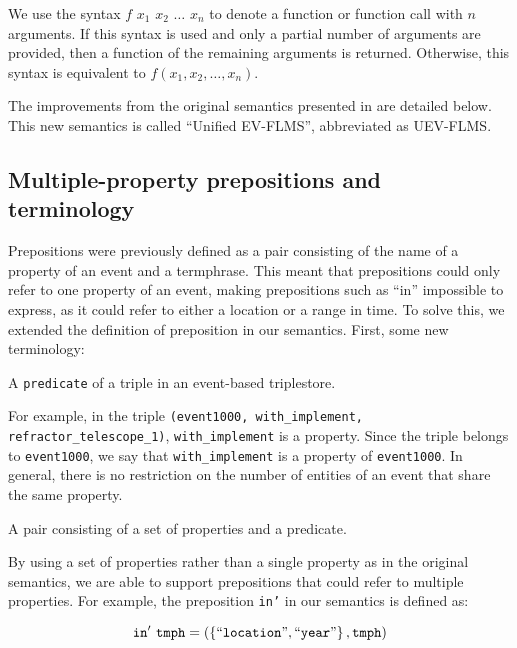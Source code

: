 \documentclass[../main.tex]{subfiles}
\begin{document}
We use the syntax $f$ $x_1$ $x_2$ $\dots$ $x_n$ to denote a function or function call with $n$ arguments.  If this syntax is used
and only a partial number of arguments are provided, then a function of the remaining arguments is returned.  Otherwise,
this syntax is equivalent to $f(x_1, x_2, \dots, x_n)$.

The improvements from the original semantics presented in
\cite{frost2014demonstration}\cite{frostagboola2014} are detailed below.
This new semantics is called ``Unified EV-FLMS'', abbreviated as UEV-FLMS.

\subsection{Multiple-property prepositions and terminology}

Prepositions were previously defined as a pair consisting of the name of a property of an event and a termphrase.  This meant that prepositions could
only refer to one property of an event, making prepositions such as ``in''
impossible to express, as it could refer to either a location or a range in time.
To solve this, we extended the definition of preposition in our semantics.  First, some new terminology:

\begin{definition}[Property]
	A \texttt{predicate} of a triple in an event-based triplestore.
\end{definition}

For example, in the triple \texttt{(event1000, with\_implement, refractor\_telescope\_1)}, \texttt{with\_implement} is a property.  Since the triple belongs to \texttt{event1000}, we say that \texttt{with\_implement} is a property of \texttt{event1000}.  In general, there is no restriction on the number of entities of an event that share the same property.

\begin{definition}[Preposition]
	A pair consisting of a set of properties and a predicate.
\end{definition}

By using a set of properties rather than a single property as in the original semantics, we are able to support prepositions that could refer to multiple properties.
For example, the preposition \texttt{in'} in our semantics is defined as:

\begin{equation*}
	\mathtt{in'} \  \mathtt{tmph} = \left(\left\{\text{``\texttt{location}''}, \text{``\texttt{year}''}\right\}, \mathtt{tmph}\right)
\end{equation*}
\end{document}
